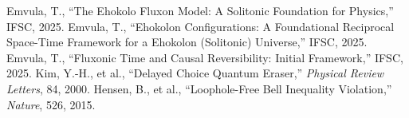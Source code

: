 \documentclass[11pt]{article}
\begin{document}
\begin{thebibliography}{5}
 Emvula, T., ``The Ehokolo Fluxon Model: A Solitonic Foundation for Physics,'' IFSC, 2025.
 Emvula, T., ``Ehokolon Configurations: A Foundational Reciprocal Space-Time Framework for a Ehokolon (Solitonic) Universe,'' IFSC, 2025.
 Emvula, T., ``Fluxonic Time and Causal Reversibility: Initial Framework,'' IFSC, 2025.
 Kim, Y.-H., et al., ``Delayed Choice Quantum Eraser,'' \textit{Physical Review Letters}, 84, 2000.
 Hensen, B., et al., ``Loophole-Free Bell Inequality Violation,'' \textit{Nature}, 526, 2015.
\end{thebibliography}
\end{document}

